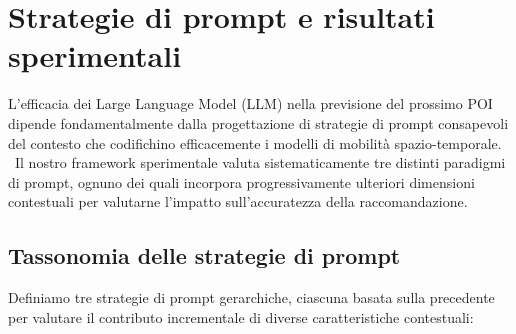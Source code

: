 \documentclass[12pt,a4paper]{article}
\begin{document}
\newpage

\section{Strategie di prompt e risultati sperimentali}

L'efficacia dei Large Language Model (LLM) nella previsione del prossimo POI dipende fondamentalmente dalla progettazione di strategie di prompt consapevoli del contesto che codifichino efficacemente i modelli di mobilità spazio-temporale. \ Il nostro framework sperimentale valuta sistematicamente tre distinti paradigmi di prompt, ognuno dei quali incorpora progressivamente ulteriori dimensioni contestuali per valutarne l'impatto sull'accuratezza della raccomandazione.

\subsection{Tassonomia delle strategie di prompt}

Definiamo tre strategie di prompt gerarchiche, ciascuna basata sulla precedente per valutare il contributo incrementale di diverse caratteristiche contestuali:
\end{document}
